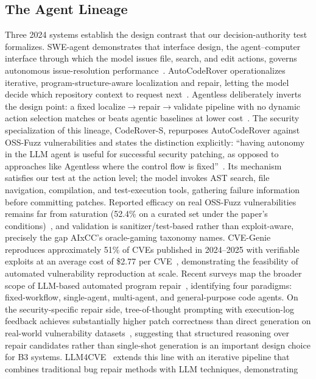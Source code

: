 \documentclass[conference,compsoc]{IEEEtran}
\begin{document}
\subsection{The Agent Lineage}
Three 2024 systems establish the design contrast that our decision-authority test formalizes.
SWE-agent demonstrates that interface design, the agent--computer interface through which the
model issues file, search, and edit actions, governs autonomous issue-resolution
performance~\cite{sweagent2024}. AutoCodeRover operationalizes iterative,
program-structure-aware localization and repair, letting the model decide which repository
context to request next~\cite{autocoderoever-2024}. Agentless deliberately inverts the design
point: a fixed localize$\rightarrow$repair$\rightarrow$validate pipeline with no dynamic action
selection matches or beats agentic baselines at lower cost~\cite{agentless2024}. The security
specialization of this lineage, CodeRover-S, repurposes AutoCodeRover against OSS-Fuzz
vulnerabilities and states the distinction explicitly: ``having autonomy in the LLM agent is
useful for successful security patching, as opposed to approaches like Agentless where the
control flow is fixed''~\cite{ossfuzz-aifixing-2024}. Its mechanism satisfies our test at the action
level; the model invokes AST search, file navigation, compilation, and test-execution tools,
gathering failure information before committing patches. Reported efficacy
on real OSS-Fuzz vulnerabilities remains far from saturation (52.4\% on a curated set under the
paper's conditions)~\cite{ossfuzz-aifixing-2024}, and validation is sanitizer/test-based rather than exploit-aware, 
precisely the gap AIxCC's oracle-gaming taxonomy names. CVE-Genie reproduces approximately 51\%
of CVEs published in 2024--2025 with verifiable exploits at an average cost of \$2.77 per
CVE~\cite{cvegenie2025}, demonstrating the feasibility of automated vulnerability reproduction
at scale. Recent surveys map the broader scope of LLM-based automated program
repair~\cite{llmaprsurvey2026}, identifying four paradigms: fixed-workflow, single-agent,
multi-agent, and general-purpose code agents. On the security-specific repair side, tree-of-thought prompting with
execution-log feedback achieves substantially higher patch correctness than direct generation on
real-world vulnerability datasets~\cite{logsinpatchesout2025}, suggesting that structured
reasoning over repair candidates rather than single-shot generation is an important
design choice for B3 systems. LLM4CVE~\cite{llm4cve2025} extends this line with an iterative
pipeline that combines traditional bug repair methods with LLM techniques, demonstrating
\end{document}
